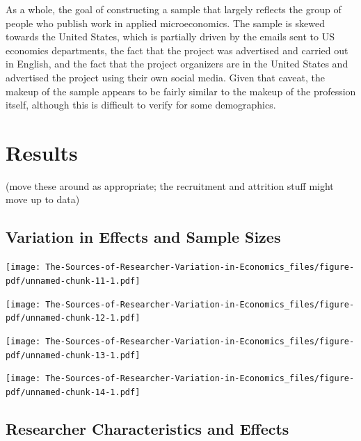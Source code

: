 \documentclass[
  letterpaper,
  DIV=11,
  numbers=noendperiod]{scrartcl}
\begin{document}
As a whole, the goal of constructing a sample that largely reflects the
group of people who publish work in applied microeconomics. The sample
is skewed towards the United States, which is partially driven by the
emails sent to US economics departments, the fact that the project was
advertised and carried out in English, and the fact that the project
organizers are in the United States and advertised the project using
their own social media. Given that caveat, the makeup of the sample
appears to be fairly similar to the makeup of the profession itself,
although this is difficult to verify for some demographics.

\hypertarget{results}{%
\section{Results}\label{results}}

(move these around as appropriate; the recruitment and attrition stuff
might move up to data)

\hypertarget{variation-in-effects-and-sample-sizes}{%
\subsection{Variation in Effects and Sample
Sizes}\label{variation-in-effects-and-sample-sizes}}

\texttt{[image: The-Sources-of-Researcher-Variation-in-Economics\_files/figure-pdf/unnamed-chunk-11-1.pdf]}

\texttt{[image: The-Sources-of-Researcher-Variation-in-Economics\_files/figure-pdf/unnamed-chunk-12-1.pdf]}

\texttt{[image: The-Sources-of-Researcher-Variation-in-Economics\_files/figure-pdf/unnamed-chunk-13-1.pdf]}

\texttt{[image: The-Sources-of-Researcher-Variation-in-Economics\_files/figure-pdf/unnamed-chunk-14-1.pdf]}

\hypertarget{researcher-characteristics-and-effects}{%
\subsection{Researcher Characteristics and
Effects}\label{researcher-characteristics-and-effects}}
\end{document}
